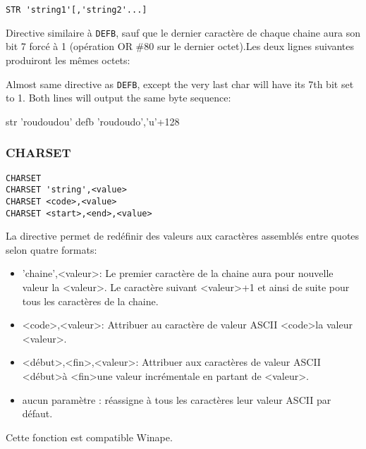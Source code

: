\begin{verbatim}
STR 'string1'[,'string2'...]
\end{verbatim}

\begin{xfr}
Directive similaire à \texttt{DEFB}, sauf que le dernier caractère de chaque chaine aura son bit 7 forcé à 1 (opération OR \#80 sur le dernier octet).Les deux lignes suivantes produiront les mêmes octets:
\end{xfr}

\begin{xen}
Almost same directive as \texttt{DEFB}, except the very last char will have its 7th bit set to 1.
Both lines will output the same byte sequence:
\end{xen}

\begin{code}
str  'roudoudou'
defb 'roudoudo','u'+128
\end{code}

\subsubsection{CHARSET}

\begin{verbatim}
CHARSET
CHARSET 'string',<value>
CHARSET <code>,<value>
CHARSET <start>,<end>,<value>
\end{verbatim}

\begin{xfr}
La directive permet de redéfinir des valeurs aux caractères assemblés entre quotes selon quatre formats:

\begin{itemize}
\item 'chaine',\textless valeur\textgreater : Le premier caractère de la chaine aura pour nouvelle valeur la \textless valeur\textgreater. Le caractère suivant \textless valeur\textgreater+1 et ainsi de suite pour tous les caractères de la chaine.
\item \textless code\textgreater,\textless valeur\textgreater : Attribuer au caractère de valeur ASCII \textless code\textgreater la valeur \textless valeur\textgreater.
\item \textless début\textgreater,\textless fin\textgreater,\textless valeur\textgreater : Attribuer aux caractères de valeur ASCII \textless début\textgreater à \textless fin\textgreater une valeur incrémentale en partant de \textless valeur\textgreater.
\item aucun paramètre : réassigne à tous les caractères leur valeur ASCII par défaut.
\end{itemize}
Cette fonction est compatible Winape.

\end{xfr}


